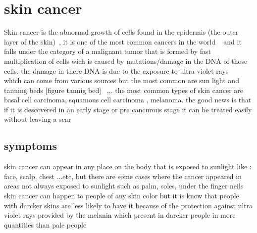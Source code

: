 \section{skin cancer}

        Skin cancer is the abnormal growth of cells found in the epidermis (the outer layer of the skin)~\cite{scf2022}, it is one of the most common cancers in the world ~\cite{nhs2020} and it falls under the category of a malignant tumor that is formed by fast multiplication of cells wich is caused by mutations/damage in the DNA  of those cells, the damage in there DNA is due to the exposure to ultra violet rays ~\cite{scf2022} which can come from various sources but the most common are sun light and tanning beds [figure tannig bed] ~\cite{mayo2020, scf2022, nhs2020},,. the most common types of skin cancer are  basal cell carcinoma, squamous cell carcinoma , melanoma. the good news is that if it is descovered in an early stage or pre cancurous stage it can be treated easily without leaving a scar



\subsection{symptoms} 
        skin cancer can appear in any place on the body that is exposed to sunlight like : face, scalp, chest ...etc, but there are some cases where the cancer appeared in areas not always exposed to sunlight such as  palm, soles, under the finger neils ~\cite{mayo2020}
        skin cancer can happen to people of any skin color but it is know that people with darcker skins are less likely to have it because of the protection against ultra violet rays provided by the melanin which present in darcker people in more quantities than pale people ~\cite{mayo2020}

